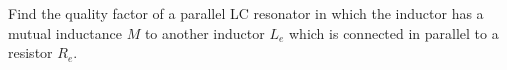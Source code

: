 

Find the quality factor of a parallel LC resonator in which the inductor has a mutual inductance $M$ to another inductor $L_e$ which is connected in parallel to a resistor $R_e$.
